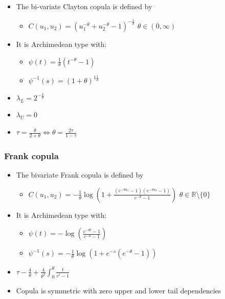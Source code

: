 \documentclass{article}
\begin{document}
\begin{itemize}
    \item The bi-variate Clayton copula is defined by
    \begin{itemize}
        \item $C(u_1,u_2) = (u_1^{-\theta} + u_2^{-\theta} -1)^{-\frac{1}{\theta}}$ \hspace{1cm} $\theta \in (0,\infty)$
    \end{itemize}
    \item It is Archimedean type with:
    \begin{itemize}
        \item $\psi(t) = \frac{1}{\theta}(t^{-\theta} -1)$ 
        \item $\psi^{-1}(s) = (1 + \theta)^{1\frac{1}{\theta}}$
    \end{itemize}
    \item $\lambda_L = 2^{-\frac{1}{\theta}}$
    \item $\lambda_U = 0$
    \item $\tau = \frac{\theta}{2 + \theta} \Leftrightarrow \theta = \frac{2\tau}{1 - \tau}$
\end{itemize}

\subsubsection{Frank copula}

\begin{itemize}
    \item The bivariate Frank copula is defined by
    \begin{itemize}
        \item $C(u_1,u_2) = - \frac{1}{\theta} \log(1 + \frac{(e^{-\theta u_1} -1)(e^{-\theta u_2}-1)}{e^{-\theta}-1})$ \hspace{1cm} $\theta \in \mathbb{R} $\textbackslash$ \{0\}$
    \end{itemize}
    \item It is Archimedean type with:
    \begin{itemize}
        \item $\psi(t) = - \log(\frac{e^{-\theta t} - 1}{e^{-\theta} -1})$ 
        \item $\psi^{-1}(s) = - \frac{1}{\theta}\log(1 + e^{-s}(e^{-\theta}-1))$
    \end{itemize}
    \item $\tau - \frac{4}{\theta} + \frac{4}{\theta^2}\int_0^\theta\frac{t}{e^t - 1}$
    \item Copula is symmetric with zero upper and lower tail dependencies
\end{itemize}
\end{document}

